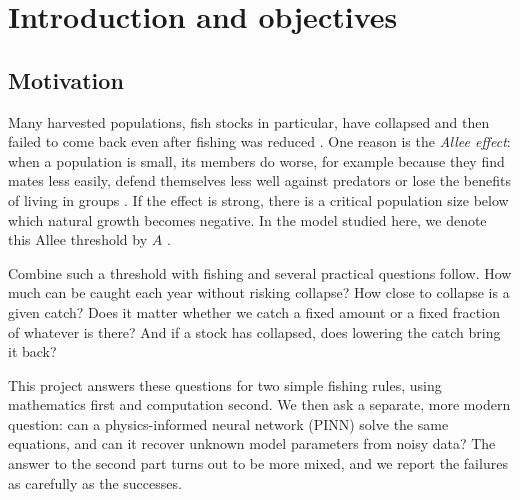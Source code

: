 \section{Introduction and objectives}
\label{sec:introduction}

\subsection{Motivation}
Many harvested populations, fish stocks in particular, have collapsed and then failed to come back even after fishing was reduced \cite{hutchings2004collapses}. One reason is the \emph{Allee effect}: when a population is small, its members do worse, for example because they find mates less easily, defend themselves less well against predators or lose the benefits of living in groups \cite{stephens1999consequences,courchamp2008allee}.
If the effect is strong, there is a critical population size below
which natural growth becomes negative. In the model studied here,
we denote this Allee threshold by $A$
\cite{dennis1989allee,courchamp2008allee}.


Combine such a threshold with fishing and several practical questions follow. How much can be caught each year without risking collapse? How close to collapse is a given catch? Does it matter whether we catch a fixed amount or a fixed fraction of whatever is there? And if a stock has collapsed, does lowering the catch bring it back?

This project answers these questions for two simple fishing rules, using mathematics first and computation second. We then ask a separate, more modern question: can a physics-informed neural network (PINN) \cite{raissi2019physics} solve the same equations, and can it recover unknown model parameters from noisy data? The answer to the second part turns out to be more mixed, and we report the failures as carefully as the successes.

